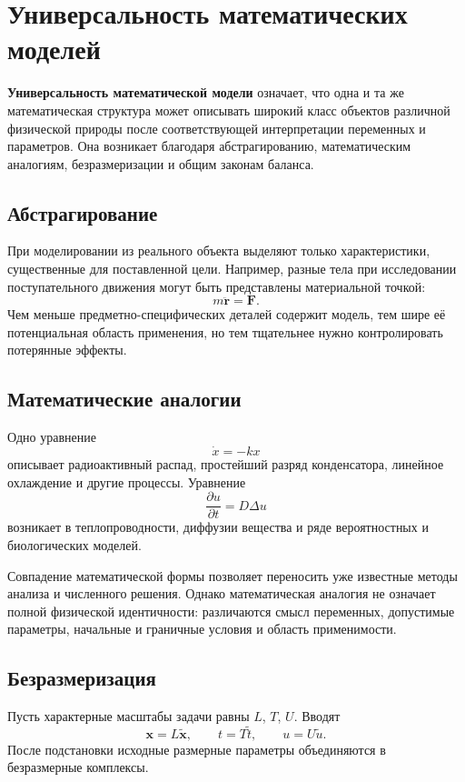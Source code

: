 \section{Универсальность математических моделей}
\label{sec:universality-models}

\textbf{Универсальность математической модели} означает, что одна и та же
математическая структура может описывать широкий класс объектов различной
физической природы после соответствующей интерпретации переменных и
параметров. Она возникает благодаря абстрагированию, математическим
аналогиям, безразмеризации и общим законам баланса.

\subsection{Абстрагирование}

При моделировании из реального объекта выделяют только характеристики,
существенные для поставленной цели. Например, разные тела при исследовании
поступательного движения могут быть представлены материальной точкой:
\[
m\ddot{\mathbf r}=\mathbf F.
\]
Чем меньше предметно-специфических деталей содержит модель, тем шире её
потенциальная область применения, но тем тщательнее нужно контролировать
потерянные эффекты.

\subsection{Математические аналогии}

Одно уравнение
\[
\dot x=-kx
\]
описывает радиоактивный распад, простейший разряд конденсатора, линейное
охлаждение и другие процессы. Уравнение
\[
\frac{\partial u}{\partial t}=D\Delta u
\]
возникает в теплопроводности, диффузии вещества и ряде вероятностных и
биологических моделей.

Совпадение математической формы позволяет переносить уже известные методы
анализа и численного решения. Однако математическая аналогия не означает
полной физической идентичности: различаются смысл переменных, допустимые
параметры, начальные и граничные условия и область применимости.

\subsection{Безразмеризация}

Пусть характерные масштабы задачи равны $L$, $T$, $U$. Вводят
\[
\mathbf x=L\widetilde{\mathbf x},
\qquad
t=T\widetilde t,
\qquad
u=U\widetilde u.
\]
После подстановки исходные размерные параметры объединяются в
безразмерные комплексы.

